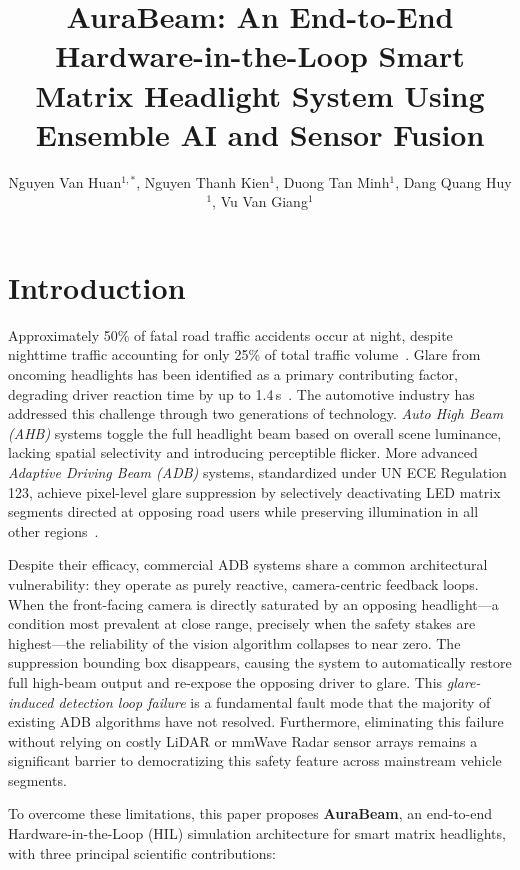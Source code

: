 \documentclass{jstarticle}
\title{AuraBeam: An End-to-End Hardware-in-the-Loop Smart Matrix
       Headlight System Using Ensemble AI and Sensor Fusion}
\author{Nguyen Van Huan$^{1,*}$, Nguyen Thanh Kien$^{1}$, Duong Tan Minh$^{1}$,
         Dang Quang Huy$^{1}$, Vu Van Giang$^{1}$}
\affiliation{$^{1}$School of Information and Communication Technology,
             Hanoi University of Science and Technology, Hanoi, Vietnam}
\theoremstyle{remark}
\begin{document}
\maketitle

\section{Introduction}
\label{sec:intro}

Approximately 50\% of fatal road traffic accidents occur at night,
despite nighttime traffic accounting for only 25\% of total traffic
volume~\cite{fhwa2025nightvisibility}. Glare from oncoming headlights
has been identified as a primary contributing factor, degrading driver
reaction time by up to 1.4\,s~\cite{hwang2018headlightglare,
beard2025glarelitreview}. The automotive industry has addressed this
challenge through two generations of technology. \emph{Auto High Beam
(AHB)} systems toggle the full headlight beam based on overall scene
luminance, lacking spatial selectivity and introducing perceptible
flicker. More advanced \emph{Adaptive Driving Beam (ADB)} systems,
standardized under UN ECE Regulation 123, achieve pixel-level glare
suppression by selectively deactivating LED matrix segments directed
at opposing road users while preserving illumination in all other
regions~\cite{Shin2026DOE_AFS}.

Despite their efficacy, commercial ADB systems share a common
architectural vulnerability: they operate as purely reactive,
camera-centric feedback loops. When the front-facing camera is
directly saturated by an opposing headlight---a condition most
prevalent at close range, precisely when the safety stakes are
highest---the reliability of the vision algorithm collapses to near
zero. The suppression bounding box disappears, causing the system to
automatically restore full high-beam output and re-expose the opposing
driver to glare. This \emph{glare-induced detection loop failure} is a
fundamental fault mode that the majority of existing ADB algorithms
have not resolved. Furthermore, eliminating this failure without
relying on costly LiDAR or mmWave Radar sensor arrays remains a
significant barrier to democratizing this safety feature across
mainstream vehicle segments.

To overcome these limitations, this paper proposes \textbf{AuraBeam},
an end-to-end Hardware-in-the-Loop (HIL) simulation architecture for
smart matrix headlights, with three principal scientific contributions:
\end{document}
